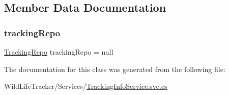 \subsection{Member Data Documentation}
\mbox{\label{classWildLifeTracker_1_1Services_1_1TrackingInfoService_a06c9afa34640dfb7799f60c2bf14f821}} 
\subsubsection{\texorpdfstring{tracking\+Repo}{trackingRepo}}
{\footnotesize\ttfamily \hyperlink{classWildLifeTracker_1_1Repository_1_1TrackingRepo}{Tracking\+Repo} tracking\+Repo = null\hspace{0.3cm}{\ttfamily [private]}}



The documentation for this class was generated from the following file\+:\begin{DoxyCompactItemize}
\item 
Wild\+Life\+Tracker/\+Services/\hyperlink{TrackingInfoService_8svc_8cs}{Tracking\+Info\+Service.\+svc.\+cs}\end{DoxyCompactItemize}
